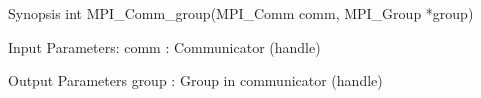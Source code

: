 Synopsis
int MPI_Comm_group(MPI_Comm comm, MPI_Group *group)

Input Parameters:
comm : Communicator (handle)

Output Parameters
group : Group in communicator (handle)
